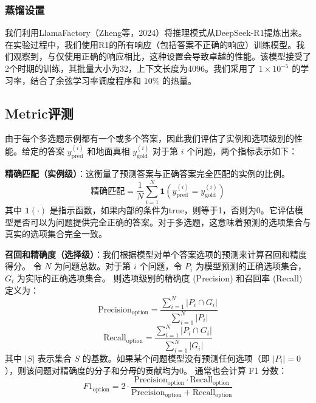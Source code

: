 \documentclass{pkuthesis}
\begin{document}
\subsubsection{蒸馏设置}
我们利用LlamaFactory（Zheng等，2024）将推理模式从DeepSeek-R1提炼出来。在实验过程中，我们使用R1的所有响应（包括答案不正确的响应）训练模型。我们观察到，与仅使用正确的响应相比，这种设置会导致卓越的性能。该模型接受了2个时期的训练，其批量大小为32，上下文长度为4096。我们采用了 $1 \times 10^{-5}$ 的学习率，结合了余弦学习率调度程序和 $10\%$ 的热量。

\subsection{Metric评测}
由于每个多选题示例都有一个或多个答案，因此我们评估了实例和选项级别的性能。给定的答案 $y^{(i)}_{\text{pred}}$ 和地面真相 $y^{(i)}_{\text{gold}}$ 对于第 $i$ 个问题，两个指标表示如下：

\textbf{精确匹配（实例级）}：这衡量了预测答案与正确答案完全匹配的实例的比例。
$$ \text{精确匹配} = \frac{1}{N} \sum_{i=1}^{N} \mathbf{1}(y^{(i)}_{\text{pred}} = y^{(i)}_{\text{gold}}) $$
其中 $\mathbf{1}(\cdot)$ 是指示函数，如果内部的条件为true，则等于1，否则为0。它评估模型是否可以为问题提供完全正确的答案。对于多选题，这意味着预测的选项集合与真实的选项集合完全一致。

\textbf{召回和精确度（选择级）}：我们根据模型对单个答案选项的预测来计算召回和精度得分。
令 $N$ 为问题总数。对于第 $i$ 个问题，令 $P_i$ 为模型预测的正确选项集合，$G_i$ 为实际的正确选项集合。
则选项级别的精确度 (Precision) 和召回率 (Recall) 定义为：
$$ \text{Precision}_{\text{option}} = \frac{\sum_{i=1}^N |P_i \cap G_i|}{\sum_{i=1}^N |P_i|} $$
$$ \text{Recall}_{\text{option}} = \frac{\sum_{i=1}^N |P_i \cap G_i|}{\sum_{i=1}^N |G_i|} $$
其中 $|S|$ 表示集合 $S$ 的基数。如果某个问题模型没有预测任何选项（即 $|P_i|=0$），则该问题对精确度的分子和分母的贡献均为0。
通常也会计算 F1 分数：
$$ F1_{\text{option}} = 2 \cdot \frac{\text{Precision}_{\text{option}} \cdot \text{Recall}_{\text{option}}}{\text{Precision}_{\text{option}} + \text{Recall}_{\text{option}}} $$
\end{document}
